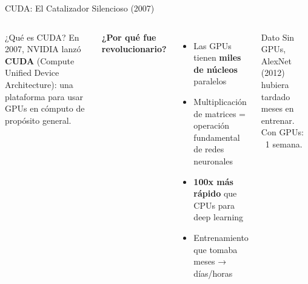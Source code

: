 \documentclass[aspectratio=169]{beamer}
\begin{document}
\begin{frame}{CUDA: El Catalizador Silencioso (2007)}
    \begin{columns}
        \begin{block}{¿Qué es CUDA?}
            En 2007, NVIDIA lanzó \textbf{CUDA} (Compute Unified Device Architecture): una plataforma para usar GPUs en cómputo de propósito general.
        \end{block}
        
        \vspace{0.2cm}
        \textbf{¿Por qué fue revolucionario?}
        \begin{itemize}
            \item Las GPUs tienen \textbf{miles de núcleos} paralelos
            \item Multiplicación de matrices = operación fundamental de redes neuronales
            \item \textbf{100x más rápido} que CPUs para deep learning
            \item Entrenamiento que tomaba meses → días/horas
        \end{itemize}
        
        \centering
        
        \vspace{0.3cm}
        \begin{exampleblock}{Dato}
            Sin GPUs, AlexNet (2012) hubiera tardado meses en entrenar. Con GPUs: ~1 semana.
        \end{exampleblock}
    \end{columns}
\end{frame}
\end{document}
